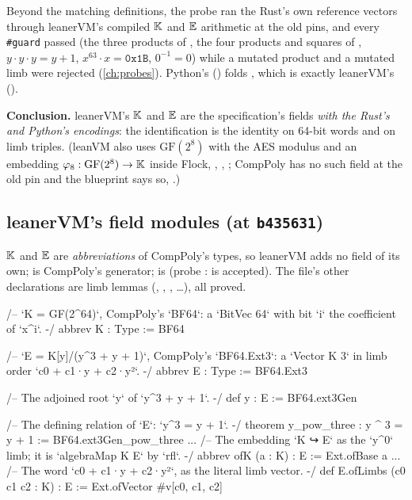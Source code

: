 Beyond the matching definitions, the probe  ran the Rust's own reference
vectors through leanerVM's compiled $\mathbb{K}$ and $\mathbb{E}$ arithmetic at the old pins, and every
\texttt{\#guard} passed (the three products of , the four products and
squares of , $y \cdot y \cdot y = y + 1$, $x^{63} \cdot x =
\mathtt{0x1B}$, $0^{-1} = 0$) while a mutated product and a mutated limb were rejected
(\cref{ch:probes}). Python's  () folds
, which is exactly leanerVM's 
(\allowbreak{}\allowbreak{}).

\textbf{Conclusion.} leanerVM's $\mathbb{K}$ and $\mathbb{E}$ are the specification's fields \emph{with the
Rust's and Python's encodings}: the identification is the identity on 64-bit words and on limb
triples. (leanVM also uses $\mathrm{GF}(2^8)$ with the AES modulus and an embedding
$\varphi_8 : \mathrm{GF}(2^8) \to \mathbb{K}$ inside Flock, \allowbreak{}\allowbreak{}\allowbreak{}\allowbreak{},
, ; CompPoly has no such field at the old
pin and the blueprint says so, .)

\subsection{leanerVM's field modules (at \texorpdfstring{\texttt{b435631}}{b435631})}\label{sec:gen-lib-comppoly-leanervm}

$\mathbb{K}$ and $\mathbb{E}$ are \emph{abbreviations} of CompPoly's types, so leanerVM adds no field of its own;
 is CompPoly's generator;  is  (probe :
 is accepted). The file's other
declarations are limb lemmas (, , , \dots), all
proved.

\begin{leancode}
/-- `K = GF(2^64)`, CompPoly's `BF64`: a `BitVec 64` with bit `i` the coefficient of `x^i`. -/
abbrev K : Type := BF64

/-- `E = K[y]/(y^3 + y + 1)`, CompPoly's `BF64.Ext3`: a `Vector K 3` in limb order
`c0 + c1·y + c2·y²`. -/
abbrev E : Type := BF64.Ext3

/-- The adjoined root `y` of `y^3 + y + 1`. -/
def y : E := BF64.ext3Gen

/-- The defining relation of `E`: `y^3 = y + 1`. -/
theorem y_pow_three : y ^ 3 = y + 1 := BF64.ext3Gen_pow_three
...
/-- The embedding `K ↪ E` as the `y^0` limb; it is `algebraMap K E` by `rfl`. -/
abbrev ofK (a : K) : E := Ext.ofBase a
...
/-- The word `c0 + c1·y + c2·y²`, as the literal limb vector. -/
def E.ofLimbs (c0 c1 c2 : K) : E := Ext.ofVector #v[c0, c1, c2]
\end{leancode}

